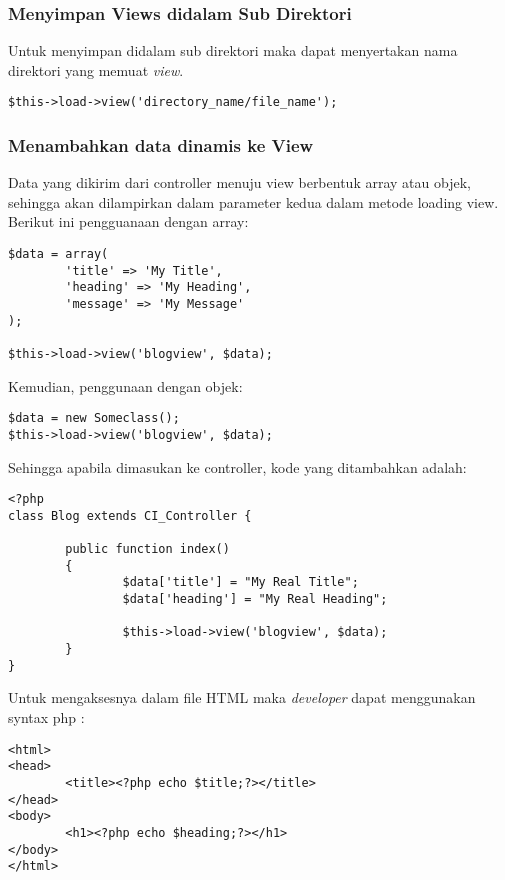 \subsubsection{Menyimpan Views didalam Sub Direktori}

Untuk menyimpan didalam sub direktori maka dapat menyertakan nama direktori yang memuat \textit{view}.
\begin{lstlisting}[frame=single] 
$this->load->view('directory_name/file_name');
\end{lstlisting}

\subsubsection{Menambahkan data dinamis ke View}

Data yang dikirim dari controller menuju view berbentuk array atau objek, sehingga akan dilampirkan dalam parameter kedua dalam metode loading view.
Berikut ini pengguanaan dengan array:
\begin{lstlisting}[frame=single] 
$data = array(
        'title' => 'My Title',
        'heading' => 'My Heading',
        'message' => 'My Message'
);

$this->load->view('blogview', $data);
\end{lstlisting}

\noindent Kemudian, penggunaan dengan objek:
\begin{lstlisting}[frame=single] 
$data = new Someclass();
$this->load->view('blogview', $data);
\end{lstlisting}

\noindent Sehingga apabila dimasukan ke controller, kode yang ditambahkan adalah:
\begin{lstlisting}[frame=single] 
<?php
class Blog extends CI_Controller {

        public function index()
        {
                $data['title'] = "My Real Title";
                $data['heading'] = "My Real Heading";

                $this->load->view('blogview', $data);
        }
}
\end{lstlisting}

Untuk mengaksesnya dalam file HTML maka \textit{developer} dapat menggunakan syntax php :
\begin{lstlisting}[frame=single] 
<html>
<head>
        <title><?php echo $title;?></title>
</head>
<body>
        <h1><?php echo $heading;?></h1>
</body>
</html>
\end{lstlisting}

